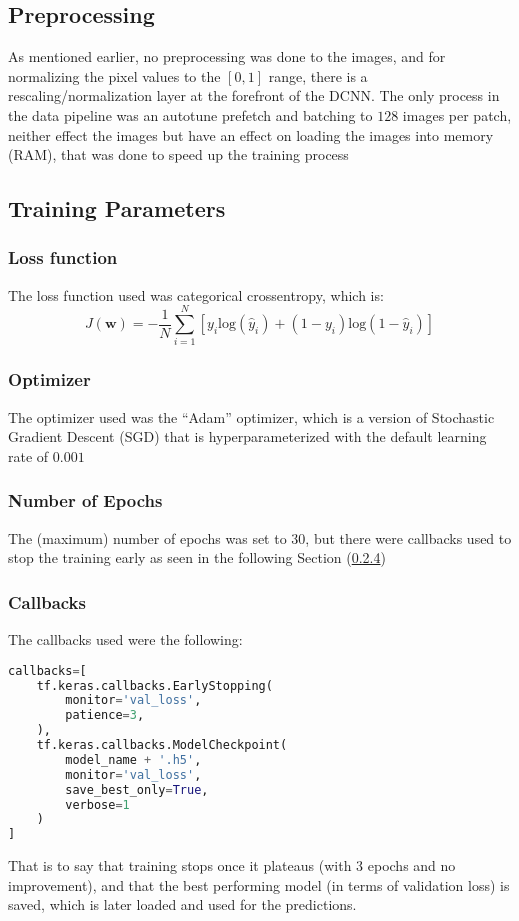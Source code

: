 \documentclass[conference]{IEEEtran}
\begin{document}
\subsection{Preprocessing}
As mentioned earlier, no preprocessing was done to the images, and for normalizing the pixel values to the $[0, 1]$ range, there is a rescaling/normalization layer at the forefront of the DCNN. The only process in the data pipeline was an autotune prefetch and batching to $128$ images per patch, neither effect the images but have an effect on loading the images into memory (RAM), that was done to speed up the training process
\subsection{Training Parameters}
\subsubsection{Loss function}
The loss function used was categorical crossentropy, which is:
\begin{equation}
    J(\textbf{w}) = -\frac{1}{N} \sum_{i=1}^{N} \left[ y_i \text{log}(\hat{y}_i) + (1-y_i) \text{log}(1-\hat{y}_i) \right]
\end{equation}
\subsubsection{Optimizer}
The optimizer used was the ``Adam'' optimizer, which is a version of Stochastic Gradient Descent (SGD)\cite{adam} that is hyperparameterized with the default learning rate of $0.001$
\subsubsection{Number of Epochs}
The (maximum) number of epochs was set to 30, but there were callbacks used to stop the training early as seen in the following Section (\ref{sec:callbacks})
\subsubsection{Callbacks}\label{sec:callbacks}
The callbacks used were the following:
\begin{lstlisting}[language=Python]
callbacks=[
    tf.keras.callbacks.EarlyStopping(
        monitor='val_loss',
        patience=3,
    ),
    tf.keras.callbacks.ModelCheckpoint(
        model_name + '.h5',
        monitor='val_loss',
        save_best_only=True,
        verbose=1
    )
]
\end{lstlisting}
That is to say that training stops once it plateaus (with 3 epochs and no improvement), and that the best performing model (in terms of validation loss) is saved, which is later loaded and used for the predictions.\@ 
\end{document}
